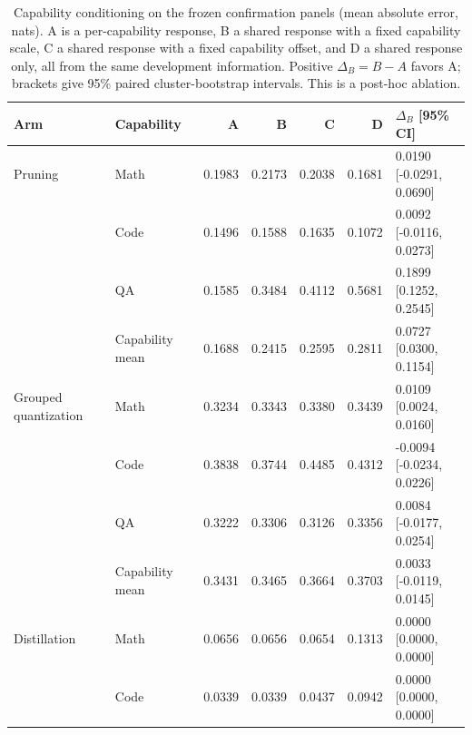 \begin{table}[!htbp]\normalfont
\centering
\small
\setlength{\tabcolsep}{3pt}
\caption{Capability conditioning on the frozen confirmation panels (mean absolute error, nats). A is a per-capability response, B a shared response with a fixed capability scale, C a shared response with a fixed capability offset, and D a shared response only, all from the same development information. Positive $\Delta_B=B-A$ favors A; brackets give 95\% paired cluster-bootstrap intervals. This is a \mbox{post-hoc} ablation.}
\label{tab:cap_conditioning}
\begin{tabular*}{\textwidth}{@{\extracolsep{\fill}}llrrrrl@{}}
\toprule
Arm & Capability & A & B & C & D & $\Delta_B$ [95\% CI] \\
\midrule
Pruning & Math & 0.1983 & 0.2173 & 0.2038 & 0.1681 & \shortstack[l]{0.0190 [-0.0291,\\0.0690]} \\
 & Code & 0.1496 & 0.1588 & 0.1635 & 0.1072 & \shortstack[l]{0.0092 [-0.0116,\\0.0273]} \\
 & QA & 0.1585 & 0.3484 & 0.4112 & 0.5681 & \shortstack[l]{0.1899 [0.1252,\\0.2545]} \\
 & Capability mean & 0.1688 & 0.2415 & 0.2595 & 0.2811 & \shortstack[l]{0.0727 [0.0300,\\0.1154]} \\
\midrule
Grouped quantization & Math & 0.3234 & 0.3343 & 0.3380 & 0.3439 & \shortstack[l]{0.0109 [0.0024,\\0.0160]} \\
 & Code & 0.3838 & 0.3744 & 0.4485 & 0.4312 & \shortstack[l]{-0.0094 [-0.0234,\\0.0226]} \\
 & QA & 0.3222 & 0.3306 & 0.3126 & 0.3356 & \shortstack[l]{0.0084 [-0.0177,\\0.0254]} \\
 & Capability mean & 0.3431 & 0.3465 & 0.3664 & 0.3703 & \shortstack[l]{0.0033 [-0.0119,\\0.0145]} \\
\midrule
Distillation & Math & 0.0656 & 0.0656 & 0.0654 & 0.1313 & \shortstack[l]{0.0000 [0.0000,\\0.0000]} \\
 & Code & 0.0339 & 0.0339 & 0.0437 & 0.0942 & \shortstack[l]{0.0000 [0.0000,\\0.0000]} \\

\end{tabular*}
\end{table}

